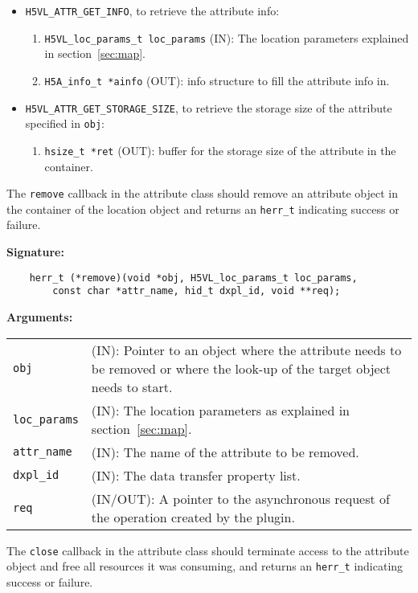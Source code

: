 \begin{itemize}
\item {\tt H5VL\_ATTR\_GET\_INFO}, to retrieve the attribute info:
  \begin{enumerate}
  \item {\tt H5VL\_loc\_params\_t loc\_params} (IN): The location parameters
    explained in section~\ref{sec:map}. 
  \item {\tt H5A\_info\_t *ainfo} (OUT): info structure to fill the
    attribute info in.
  \end{enumerate}

\item {\tt H5VL\_ATTR\_GET\_STORAGE\_SIZE}, to retrieve the storage
  size of the attribute specified in {\tt obj}:
  \begin{enumerate}
  \item {\tt hsize\_t *ret} (OUT): buffer for the storage size of
    the attribute in the container.
  \end{enumerate}

\end{itemize}

The {\tt remove} callback in the attribute class should remove an
attribute object in the container of the location object and returns
an {\tt herr\_t} indicating success or failure.

\textbf{Signature:}
\begin{lstlisting}
    herr_t (*remove)(void *obj, H5VL_loc_params_t loc_params, 
        const char *attr_name, hid_t dxpl_id, void **req);
\end{lstlisting}

\textbf{Arguments:}\\
\begin{tabular}{l p{10cm}}
  {\tt obj} & (IN): Pointer to an object where the attribute needs
  to be removed or where the look-up of the target object needs to
  start.\\
  {\tt loc\_params} & (IN): The location parameters as explained in
  section~\ref{sec:map}.\\
  {\tt attr\_name} & (IN): The name of the attribute to be removed.\\
  {\tt dxpl\_id} & (IN): The data transfer property list.\\
  {\tt req} & (IN/OUT): A pointer to the asynchronous request of the
  operation created by the plugin.\\
\end{tabular}

The {\tt close} callback in the attribute class should terminate
access to the attribute object and free all resources it was
consuming, and returns an {\tt herr\_t} indicating success or failure.

